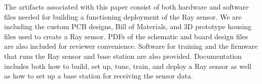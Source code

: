The artifacts associated with this paper consist of both hardware and software files needed for building a functioning deployment of the Ray sensor.  We are including the custom PCB designs, Bill of Materials, and 3D prototype housing files used to create a Ray sensor. PDFs of the schematic and board design files are also included for reviewer convenience.  Software for training and the firmware that runs the Ray sensor and base station are also provided.  Documentation includes both how to build, set up, tune, train, and deploy a Ray sensor as well as how to set up a base station for receiving the sensor data.